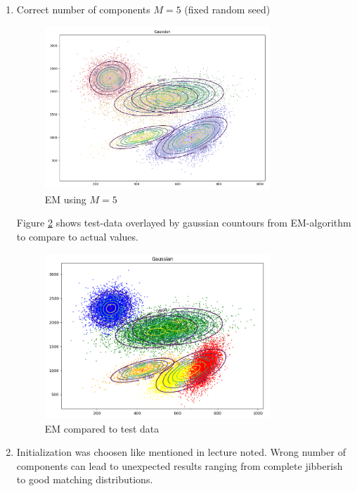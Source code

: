 \documentclass[12pt,a4paper]{article}
\begin{document}
\setcounter{enumi}{2}
\begin{enumerate}[start=2,label*={\arabic*.}]
  \item Correct number of components $M = 5$ (fixed random seed)
  
\begin{figure}[H]
  \centering
  \includegraphics[width=0.8\textwidth]{figures/1_2.png}
	\caption{EM using $M = 5$}
	\label{1_2}
\end{figure}

Figure \ref{1_2_compare} shows test-data overlayed by gaussian countours from
EM-algorithm to compare to actual values.

\begin{figure}[H]
  \centering
  \includegraphics[width=0.8\textwidth]{figures/1_2_compare.png}
	\caption{EM compared to test data}
	\label{1_2_compare}
\end{figure}
  
  \item Initialization was choosen like mentioned in lecture
  noted\autocite{lecuter_notes_spsc}. Wrong number of components can lead to
  unexpected results ranging from complete jibberish to good matching
  distributions.
  

\end{enumerate}
\end{document}

